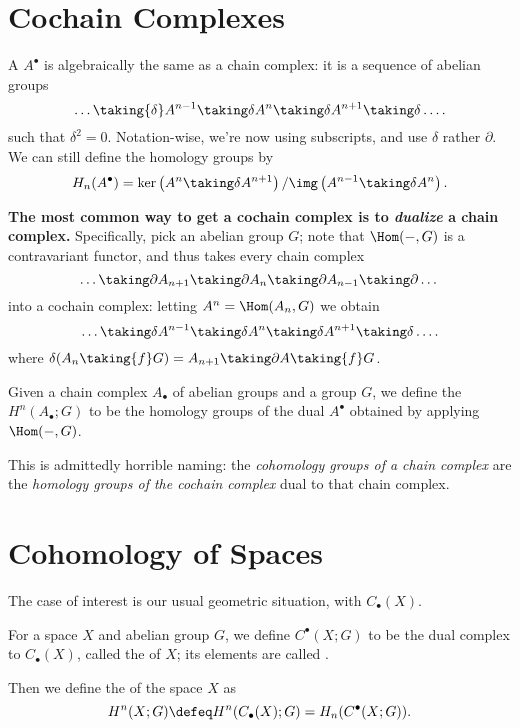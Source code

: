 \documentclass[11pt]{scrreprt}
\begin{document}
\section{Cochain Complexes}
\begin{definition}
A  $A^\bullet$ is algebraically the same as a chain complex:
it is a sequence of abelian groups
\[ \dots \taking{\delta} A^{n-1} \taking\delta A^n \taking\delta A^{n+1} \taking\delta \dots. \]
such that $\delta^2 = 0$.
Notation-wise, we're now using subscripts, and use $\delta$ rather $\partial$.
We can still define the homology groups by
\[ H_n(A^\bullet) = \ker\left( A^n \taking\delta A^{n+1} \right)
	/ \img\left( A^{n-1} \taking\delta A^n \right). \]
\end{definition}

\textbf{The most common way to get a cochain complex
is to \emph{dualize} a chain complex.}
Specifically, pick an abelian group $G$;
note that $\Hom(-, G)$ is a contravariant functor,
and thus takes every chain complex
\[ \dots \taking\partial A_{n+1} \taking\partial
	A_n \taking\partial A_{n-1} \taking\partial \dots \]
into a cochain complex: letting $A^n = \Hom(A_n, G)$ we obtain
\[ \dots \taking\delta A^{n-1} \taking\delta
	A^n \taking\delta A^{n+1} \taking\delta \dots. \]
where $\delta(A_n \taking{f} G) = A_{n+1} \taking\partial A \taking{f} G$.
\begin{definition}
	Given a chain complex $A_\bullet$ of abelian groups and a group $G$,
	we define the  $H^n(A_\bullet; G)$ to be the
	homology groups of the dual $A^\bullet$ obtained by applying $\Hom(-,G)$.
\end{definition}
This is admittedly horrible naming:
the \emph{cohomology groups of a chain complex}
are the \emph{homology groups of the cochain complex}
dual to that chain complex.

\section{Cohomology of Spaces}

The case of interest is our usual geometric situation, with $C_\bullet(X)$.
\begin{definition}
	For a space $X$ and abelian group $G$,
	we define $C^\bullet(X;G)$ to be the dual complex to $C_\bullet(X)$,
	called the  of $X$;
	its elements are called .

	Then we define the 
	of the space $X$ as 
	\[ H^n(X; G) \defeq H^n(C_\bullet(X); G) = H_n(C^\bullet(X;G)). \]
\end{definition}
\end{document}

